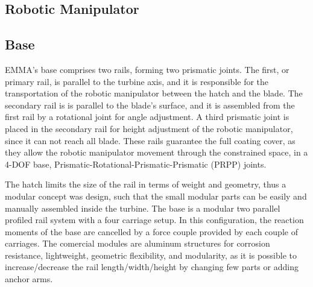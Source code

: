 \subsection{Robotic Manipulator}

\subsection{Base}

EMMA's base comprises two rails, forming two prismatic joints. The
first, or primary rail, is parallel to the turbine axis, and it is responsible
for the transportation of the robotic manipulator between the hatch and the
blade. The secondary rail is is parallel to the blade's surface, and it is
assembled from the first rail by a rotational joint for angle adjustment. A
third prismatic joint is placed in the secondary rail for height adjustment of
the robotic manipulator, since it can not reach all blade. These rails guarantee
the full coating cover, as they allow the robotic manipulator movement through
the constrained space, in a 4-DOF base, Prismatic-Rotational-Prismatic-Prismatic
(PRPP) joints.

The hatch limits the size of the rail in terms of weight and geometry, thus a
modular concept was design, such that the small modular parts can be easily and manually assembled inside the
turbine. The base is a modular two parallel profiled rail system %
with a four carriage setup. In this configuration, the reaction moments of the
base are cancelled by a force couple provided by each couple of carriages. The
comercial modules are aluminum structures for corrosion resistance,
lightweight, geometric flexibility, and modularity, as it is possible to
increase/decrease the rail length/width/height by changing few parts or adding
anchor arms. %

\begin{comment}
A comercial modular profile system in aluminum is used to form the main
structure in wich the rails are mounted. The main advantages of this kind of
system are a corrosion resistant and light structure with a large flexibility
in terms of geometry and modularity so that it is possible to increase or
decrease length, width or height of the structure changing few parts, add
anchor arms and many other accessories quickly.
\end{comment}

